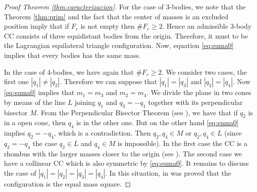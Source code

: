 \documentclass[twoside]{article}
\theoremstyle{remark}
\begin{document}
\begin{proof}[Proof Theorem \ref{thm:caracterizacion}]
For the case of 3-bodies, we note that the Theorem \ref{thm:prim} and the fact that the center of masses is an excluded position imply that if $F_r$ is not empty then $\# F_r\geq 2$. Hence an admissible 3-body CC consists of three equidistant bodies from the origin. Therefore, it must to be the Lagrangian equilateral triangle configuration. Now, equation \eqref{eq:suma0} implies that every bodies has the same mass.

In the case of 4-bodies, we have again that $\# F_r\geq 2$.  We consider two cases, the first one  $|q_1|\neq|q_2|$.  Therefore we can suppose that $|q_1|=|q_3|$ and $|q_2|=|q_4|$. Now \eqref{eq:suma0} implies that
 $m_1=m_3$ and $m_2=m_4$.  We divide the plane in two cones by means of  the line $L$ joining $q_1$  and $q_3=-q_1$ together with its perpendicular bisector $M$.  From the Perpendicular Bisector Theorem (see \cite{moeckel1990central}), we have that if  $q_2$  is in a open cone, then  $q_4$ is in the other one. But on the other hand \eqref{eq:suma0} implies $q_2=-q_4$, which is a contradiction. Then $q_2,q_4\in M$ or $q_2,q_4\in L$ (since $q_2=-q_4$ the case $q_2\in L$ and $q_4\in M$ is impossible). In the first case the CC is a rhombus with the larger masses closer to the origin (see  \cite{perez2007convex}). The second case we have a collinear CC which is also symmetric by  \eqref{eq:suma0}.
 It remains to discuss the case of $|q_1|=|q_2|=|q_3|=|q_4|$. In this situation, in \cite{hampton2005co} was proved that the configuration is the equal mass square.
\end{proof}
\end{document}
